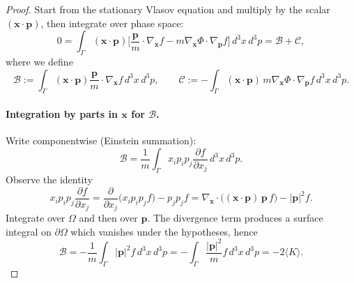 \documentclass[12pt,a4paper]{article}
\numberwithin{equation}{section}
\begin{document}
\begin{proof}
Start from the stationary Vlasov equation and multiply by the scalar $(\mathbf{x}\!\cdot\!\mathbf{p})$, then integrate over phase space:
\begin{equation}
0
= \int_{\Gamma} (\mathbf{x}\!\cdot\!\mathbf{p})\Big[\frac{\mathbf{p}}{m}\!\cdot\!\nabla_{\mathbf{x}} f - m\nabla_{\mathbf{x}}\Phi\!\cdot\!\nabla_{\mathbf{p}} f\Big]\,d^3x\,d^3p
= \mathscr{B} + \mathscr{C},
\end{equation}
where we define
\begin{equation}
\mathscr{B} := \int_{\Gamma} (\mathbf{x}\!\cdot\!\mathbf{p})\frac{\mathbf{p}}{m}\!\cdot\!\nabla_{\mathbf{x}} f\,d^3x\,d^3p,
\qquad
\mathscr{C} := -\int_{\Gamma} (\mathbf{x}\!\cdot\!\mathbf{p})\,m\nabla_{\mathbf{x}}\Phi\!\cdot\!\nabla_{\mathbf{p}} f\,d^3x\,d^3p.
\end{equation}

\paragraph{Integration by parts in \(\mathbf{x}\) for \(\mathscr{B}\).}
Write componentwise (Einstein summation):
\begin{equation}
\mathscr{B} = \frac{1}{m}\int_{\Gamma} x_i p_i p_j \frac{\partial f}{\partial x_j}\,d^3x\,d^3p.
\end{equation}
Observe the identity
\begin{equation}
x_i p_i p_j \frac{\partial f}{\partial x_j}
= \frac{\partial}{\partial x_j}\big(x_i p_i p_j f\big) - p_j p_j f
= \nabla_{\mathbf{x}}\!\cdot\!\big( (\mathbf{x}\!\cdot\!\mathbf{p})\,\mathbf{p}\, f \big) - |\mathbf{p}|^2 f.
\end{equation}
Integrate over \(\Omega\) and then over \(\mathbf{p}\). The divergence term produces a surface integral on \(\partial\Omega\) which vanishes under the hypotheses, hence
\begin{equation}
\mathscr{B} = -\frac{1}{m}\int_{\Gamma} |\mathbf{p}|^2 f\,d^3x\,d^3p
= -\int_{\Gamma}\frac{|\mathbf{p}|^2}{m} f\,d^3x\,d^3p
= -2\langle {K}\rangle.
\end{equation}


\end{proof}
\end{document}

